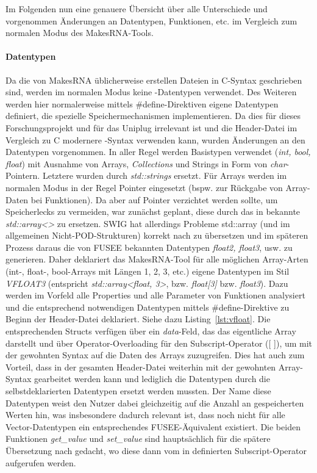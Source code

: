 Im Folgenden nun eine genauere Übersicht über alle Unterschiede und vorgenommen Änderungen an Datentypen, Funktionen, etc. im Vergleich zum normalen Modus des MakesRNA-Tools.

\paragraph{Datentypen}

Da die von MakesRNA üblicherweise erstellen Dateien in C-Syntax geschrieben sind, werden im normalen Modus keine \CC-Datentypen verwendet. Des Weiteren werden hier normalerweise mittels \#define-Direktiven eigene Datentypen definiert, die spezielle Speichermechanismen implementieren. Da dies für dieses Forschungsprojekt und für das Uniplug irrelevant ist und die Header-Datei im Vergleich zu C modernere \CC-Syntax verwenden kann, wurden Änderungen an den Datentypen vorgenommen. In aller Regel werden Basistypen verwendet (\emph{int, bool, float}) mit Ausnahme von Arrays, \emph{Collections} und Strings in Form von \emph{char}-Pointern. Letztere wurden durch \emph{std::strings} ersetzt. Für Arrays werden im normalen Modus in der Regel Pointer eingesetzt (bspw. zur Rückgabe von Array-Daten bei Funktionen). Da aber auf Pointer verzichtet werden sollte, um Speicherlecks zu vermeiden, war zunächst geplant, diese durch das in \CC{} bekannte \emph{std::array<>} zu ersetzen. SWIG hat allerdings Probleme std::array (und im allgemeinen Nicht-POD-Strukturen) korrekt nach \CS{} zu übersetzen und im späteren Prozess daraus die von FUSEE bekannten Datentypen \emph{float2, float3}, usw. zu generieren. Daher deklariert das MakesRNA-Tool für alle möglichen Array-Arten (int-, float-, bool-Arrays mit Längen 1, 2, 3, etc.) eigene Datentypen im Stil \emph{VFLOAT3} (entspricht \emph{std::array<float, 3>}, bzw. \emph{float[3]} bzw. \emph{float3}). Dazu werden im Vorfeld alle Properties und alle Parameter von Funktionen analysiert und die entsprechend notwendigen Datentypen mittels \#define-Direktive zu Beginn der Header-Datei deklariert. Siehe dazu Listing~\ref{lst:vfloat}. Die entsprechenden Structs verfügen über ein \emph{data}-Feld, das das eigentliche Array darstellt und über Operator-Overloading für den Subscript-Operator ([ ]), um mit der gewohnten Syntax auf die Daten des Arrays zuzugreifen. Dies hat auch zum Vorteil, dass in der gesamten Header-Datei weiterhin mit der gewohnten Array-Syntax gearbeitet werden kann und lediglich die Datentypen durch die selbstdeklarierten Datentypen ersetzt werden mussten. Der Name diese Datentypen weist den Nutzer dabei gleichzeitig auf die Anzahl an gespeicherten Werten hin, was insbesondere dadurch relevant ist, dass noch nicht für alle Vector-Datentypen ein entsprechendes FUSEE-Äquivalent existiert. Die beiden Funktionen \emph{get\_value} und \emph{set\_value} sind hauptsächlich für die spätere Übersetzung nach \CS{} gedacht, wo diese dann vom in \CS{} definierten Subscript-Operator aufgerufen werden.


